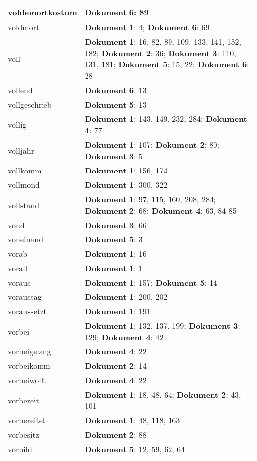 \documentclass[a5paper]{article}
\begin{document}
\begin{longtable}[l]{|l|p{3in}|}
\hline
voldemortkostum & \textbf{Dokument 6}: 89 \\
\hline
voldmort & \textbf{Dokument 1}: 4; \textbf{Dokument 6}: 69 \\
\hline
voll & \textbf{Dokument 1}: 16, 82, 89, 109, 133, 141, 152, 182; \textbf{Dokument 2}: 36; \textbf{Dokument 3}: 110, 131, 181; \textbf{Dokument 5}: 15, 22; \textbf{Dokument 6}: 28 \\
\hline
vollend & \textbf{Dokument 6}: 13 \\
\hline
vollgeschrieb & \textbf{Dokument 5}: 13 \\
\hline
vollig & \textbf{Dokument 1}: 143, 149, 232, 284; \textbf{Dokument 4}: 77 \\
\hline
volljahr & \textbf{Dokument 1}: 107; \textbf{Dokument 2}: 80; \textbf{Dokument 3}: 5 \\
\hline
vollkomm & \textbf{Dokument 1}: 156, 174 \\
\hline
vollmond & \textbf{Dokument 1}: 300, 322 \\
\hline
vollstand & \textbf{Dokument 1}: 97, 115, 160, 208, 284; \textbf{Dokument 2}: 68; \textbf{Dokument 4}: 63, 84-85 \\
\hline
vond & \textbf{Dokument 3}: 66 \\
\hline
voneinand & \textbf{Dokument 5}: 3 \\
\hline
vorab & \textbf{Dokument 1}: 16 \\
\hline
vorall & \textbf{Dokument 1}: 1 \\
\hline
voraus & \textbf{Dokument 1}: 157; \textbf{Dokument 5}: 14 \\
\hline
voraussag & \textbf{Dokument 1}: 200, 202 \\
\hline
voraussetzt & \textbf{Dokument 1}: 191 \\
\hline
vorbei & \textbf{Dokument 1}: 132, 137, 199; \textbf{Dokument 3}: 129; \textbf{Dokument 4}: 42 \\
\hline
vorbeigelang & \textbf{Dokument 4}: 22 \\
\hline
vorbeikomm & \textbf{Dokument 2}: 14 \\
\hline
vorbeiwollt & \textbf{Dokument 4}: 22 \\
\hline
vorbereit & \textbf{Dokument 1}: 18, 48, 64; \textbf{Dokument 2}: 43, 101 \\
\hline
vorbereitet & \textbf{Dokument 1}: 48, 118, 163 \\
\hline
vorbesitz & \textbf{Dokument 2}: 88 \\
\hline
vorbild & \textbf{Dokument 5}: 12, 59, 62, 64 \\

\end{longtable}
\end{document}
